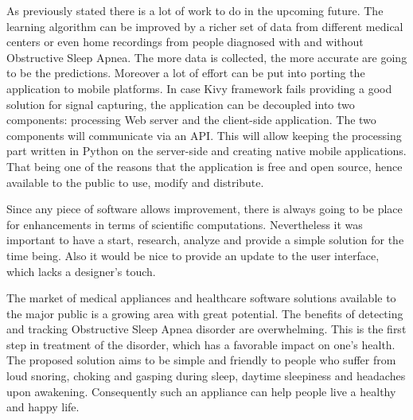 As previously stated there is a lot of work to do in the upcoming future. The learning algorithm can be improved by a richer set of data from different medical centers or even home recordings from people diagnosed with and without Obstructive Sleep Apnea. The more data is collected, the more accurate are going to be the predictions. Moreover a lot of effort can be put into porting the application to mobile platforms. In case Kivy framework fails providing a good solution for signal capturing, the application can be decoupled into two components: processing Web server and the client-side application. The two components will communicate via an API. This will allow keeping the processing part written in Python on the server-side and creating native mobile applications. That being one of the reasons that the application is free and open source, hence available to the public to use, modify and distribute.

Since any piece of software allows improvement, there is always going to be place for enhancements in terms of scientific computations. Nevertheless it was important to have a start, research, analyze and provide a simple solution for the time being. Also it would be nice to provide an update to the user interface, which lacks a designer's touch.

The market of medical appliances and healthcare software solutions available to the major public is a growing area with great potential. The benefits of detecting and tracking Obstructive Sleep Apnea disorder are overwhelming. This is the first step in treatment of the disorder, which has a favorable impact on one's health. The proposed solution aims to be simple and friendly to people who suffer from loud snoring, choking and gasping during sleep, daytime sleepiness and headaches upon awakening. Consequently such an appliance can help people live a healthy and happy life.
\clearpage
